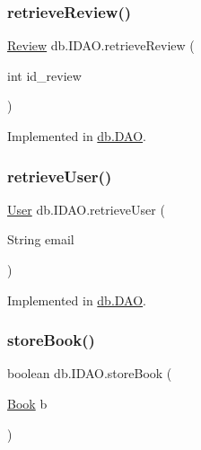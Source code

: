 \subsubsection{\texorpdfstring{retrieve\+Review()}{retrieveReview()}}
{\footnotesize\ttfamily \hyperlink{classserver_1_1data_1_1_review}{Review} db.\+I\+D\+A\+O.\+retrieve\+Review (\begin{DoxyParamCaption}\item[{int}]{id\+\_\+review }\end{DoxyParamCaption})}



Implemented in \hyperlink{classdb_1_1_d_a_o_ae43e182fae8ee7028db6ff17c2d5768f}{db.\+D\+AO}.

\mbox{\label{interfacedb_1_1_i_d_a_o_ad00bb5255d0badadbf5244799c3b708f}} 
\subsubsection{\texorpdfstring{retrieve\+User()}{retrieveUser()}}
{\footnotesize\ttfamily \hyperlink{classserver_1_1data_1_1_user}{User} db.\+I\+D\+A\+O.\+retrieve\+User (\begin{DoxyParamCaption}\item[{String}]{email }\end{DoxyParamCaption})}



Implemented in \hyperlink{classdb_1_1_d_a_o_a6da084ffd9b0da23acba9dc68e747303}{db.\+D\+AO}.

\mbox{\label{interfacedb_1_1_i_d_a_o_a39851dc1e1f05af40afeb76a5f8be99a}} 
\subsubsection{\texorpdfstring{store\+Book()}{storeBook()}}
{\footnotesize\ttfamily boolean db.\+I\+D\+A\+O.\+store\+Book (\begin{DoxyParamCaption}\item[{\hyperlink{classserver_1_1data_1_1_book}{Book}}]{b }\end{DoxyParamCaption})}



